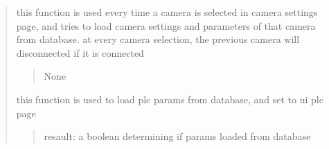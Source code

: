 \documentclass[letterpaper,10pt,english]{sphinxmanual}
\begin{document}
\begin{quote}
\begin{savenotes}
\begin{fulllineitems}
\begin{savenotes}
\begin{fulllineitems}
\end{fulllineitems}\end{savenotes}


\begin{savenotes}\begin{fulllineitems}
\label{\detokenize{setting/setting_api:oxin.setting_api.API.load_camera_params_from_db_to_UI}}
\pysigstartsignatures
{}
\pysigstopsignatures
\sphinxAtStartPar
this function is used every time a camera is selected in camera settings page, and tries to load camera settings and
parameters of that camera from database.
at every camera selection, the previous camera will disconnected if it is connected
\begin{quote}\begin{description}
\sphinxAtStartPar
None

\end{description}\end{quote}

\end{fulllineitems}\end{savenotes}


\begin{savenotes}\begin{fulllineitems}
\label{\detokenize{setting/setting_api:oxin.setting_api.API.load_plc_parms}}
\pysigstartsignatures
{}
\pysigstopsignatures
\sphinxAtStartPar
this function is used to load plc params from database, and set to ui plc page
\begin{quote}\begin{description}
\sphinxAtStartPar
resault: a boolean determining if params loaded from database

\end{description}\end{quote}

\end{fulllineitems}\end{savenotes}


\end{fulllineitems}
\end{savenotes}
\end{quote}
\end{document}
